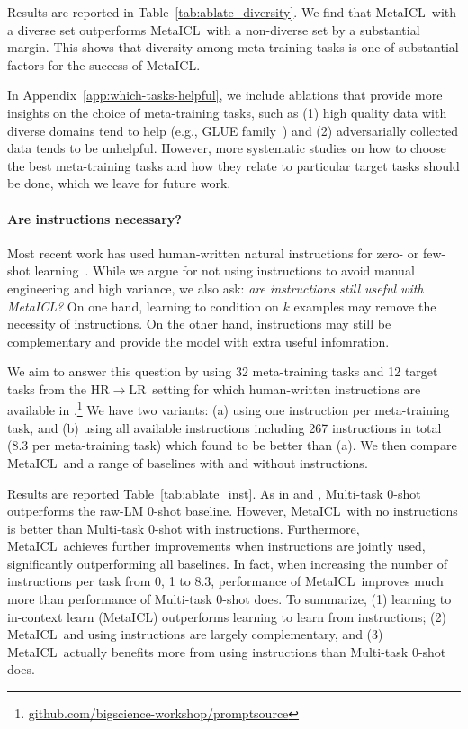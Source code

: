 Results are reported in Table~\ref{tab:ablate_diversity}.
We find that MetaICL\ with a diverse set outperforms MetaICL\ with a non-diverse set by a substantial margin. This shows that diversity among meta-training tasks is one of substantial factors for the success of MetaICL.

In Appendix~\ref{app:which-tasks-helpful}, we include ablations that provide more insights on the choice of meta-training tasks, such as (1) high quality data with diverse domains tend to help (e.g., GLUE family~\citep{wang2018glue}) and (2) adversarially collected data tends to be unhelpful. However, more systematic studies on how to choose the best meta-training tasks and how they relate to particular target tasks should be done, which we leave for future work.

\paragraph{Are instructions necessary?} Most recent work has used human-written natural instructions for zero- or few-shot learning~\citep{mishra2022cross, wei2022finetuned,sanh2022multitask}. While we argue for not using instructions to avoid manual engineering and high variance, we also ask: {\em are instructions still useful with MetaICL?} On one hand, learning to condition on $k$ examples may remove the necessity of instructions. On the other hand, instructions may still be complementary and provide the model with extra useful infomration.

We aim to answer this question by using 32 meta-training tasks and 12 target tasks from the HR$\rightarrow$LR\ setting for which human-written instructions are available in \citet{sanh2022multitask}.\footnote{\url{github.com/bigscience-workshop/promptsource}}
We have two variants: (a) using one instruction per meta-training task, and (b) using all available instructions including 267 instructions in total (8.3 per meta-training task) which \citet{sanh2022multitask} found to be better than (a). We then compare MetaICL\ and a range of baselines with and without instructions.

Results are reported Table~\ref{tab:ablate_inst}.
As in \citet{wei2022finetuned} and \citet{sanh2022multitask}, Multi-task 0-shot outperforms the raw-LM 0-shot baseline. However, MetaICL\ with no instructions is better than Multi-task 0-shot with instructions. Furthermore, MetaICL\ achieves further improvements when instructions are jointly used, significantly outperforming all baselines. In fact, when increasing the number of instructions per task from 0, 1 to 8.3, performance of MetaICL\ improves much more than performance of Multi-task 0-shot does. To summarize, (1) learning to in-context learn (MetaICL) outperforms learning to learn from instructions; (2) MetaICL\ and using instructions are largely complementary, and (3) MetaICL\ actually benefits more from using instructions than Multi-task 0-shot does.

